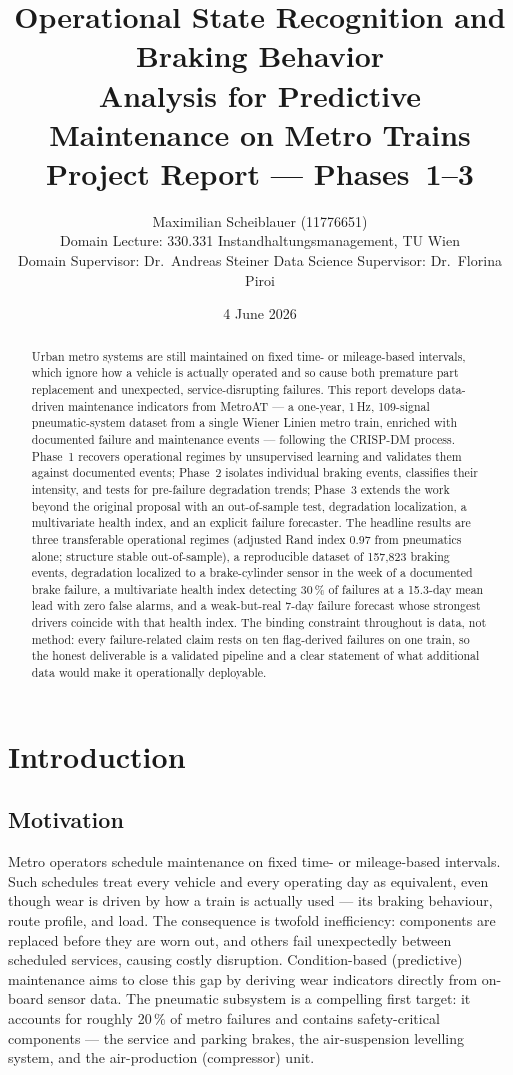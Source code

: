 \documentclass[11pt,a4paper]{article}
\title{\bfseries Operational State Recognition and Braking Behavior\\
Analysis for Predictive Maintenance on Metro Trains\\[0.4em]
\large Project Report --- Phases~1--3}
\author{Maximilian Scheiblauer (11776651)\\[0.3em]
\small Domain Lecture: 330.331 Instandhaltungsmanagement, TU Wien\\
\small Domain Supervisor: Dr.~Andreas Steiner \quad Data Science Supervisor: Dr.~Florina Piroi}
\date{4 June 2026}
\begin{document}
\maketitle

\begin{abstract}
\noindent\small
Urban metro systems are still maintained on fixed time- or mileage-based intervals,
which ignore how a vehicle is actually operated and so cause both premature part
replacement and unexpected, service-disrupting failures. This report develops data-driven
maintenance indicators from MetroAT --- a one-year, 1\,Hz, 109-signal pneumatic-system
dataset from a single Wiener Linien metro train, enriched with documented failure and
maintenance events --- following the CRISP-DM process. Phase~1 recovers operational regimes
by unsupervised learning and validates them against documented events; Phase~2 isolates
individual braking events, classifies their intensity, and tests for pre-failure
degradation trends; Phase~3 extends the work beyond the original proposal with an
out-of-sample test, degradation localization, a multivariate health index, and an explicit
failure forecaster. The headline results are three transferable operational regimes
(adjusted Rand index 0.97 from pneumatics alone; structure stable out-of-sample), a
reproducible dataset of 157{,}823 braking events, degradation localized to a brake-cylinder
sensor in the week of a documented brake failure, a multivariate health index detecting
30\,\% of failures at a 15.3-day mean lead with zero false alarms, and a weak-but-real
7-day failure forecast whose strongest drivers coincide with that health index. The binding
constraint throughout is data, not method: every failure-related claim rests on ten
flag-derived failures on one train, so the honest deliverable is a validated pipeline and a
clear statement of what additional data would make it operationally deployable.
\end{abstract}

\setcounter{section}{0}
\section{Introduction}
\label{sec:intro}

\subsection{Motivation}
Metro operators schedule maintenance on fixed time- or mileage-based intervals. Such
schedules treat every vehicle and every operating day as equivalent, even though wear is
driven by how a train is actually used --- its braking behaviour, route profile, and load.
The consequence is twofold inefficiency: components are replaced before they are worn out,
and others fail unexpectedly between scheduled services, causing costly disruption.
Condition-based (predictive) maintenance aims to close this gap by deriving wear indicators
directly from on-board sensor data. The pneumatic subsystem is a compelling first target:
it accounts for roughly 20\,\% of metro failures and contains safety-critical components
--- the service and parking brakes, the air-suspension levelling system, and the
air-production (compressor) unit.
\end{document}
